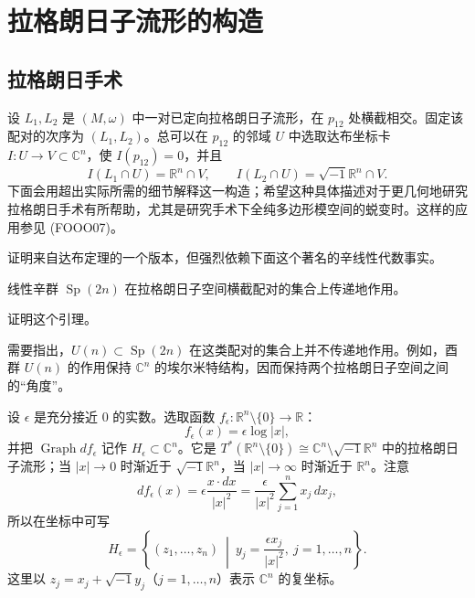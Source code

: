 \section{拉格朗日子流形的构造}
\label{sec:construction-lagrangian-submanifolds}

\subsection{拉格朗日手术}
\label{subsec:lagrangian-surgery}

设 $L_1,L_2$ 是 $(M,\omega)$ 中一对已定向拉格朗日子流形，在 $p_{12}$ 处横截相交。固定该配对的次序为 $(L_1,L_2)$。总可以在 $p_{12}$ 的邻域 $U$ 中选取达布坐标卡
$I:U\to V\subset\mathbb C^n$，使 $I(p_{12})=0$，并且
\[
 I(L_1\cap U)=\mathbb R^n\cap V,\qquad
 I(L_2\cap U)=\sqrt{-1}\mathbb R^n\cap V.
\]
下面会用超出实际所需的细节解释这一构造；希望这种具体描述对于更几何地研究拉格朗日手术有所帮助，尤其是研究手术下全纯多边形模空间的蜕变时。这样的应用参见 (FOOO07)。

证明来自达布定理的一个版本，但强烈依赖下面这个著名的辛线性代数事实。

\begin{lemma}\label{lem:sp-transitive-transverse-lagrangian-pairs}
线性辛群 $\operatorname{Sp}(2n)$ 在拉格朗日子空间横截配对的集合上传递地作用。
\end{lemma}

\begin{exercise}\label{ex:sp-transitive-transverse-lagrangian-pairs}
证明这个引理。
\end{exercise}

需要指出，$U(n)\subset\operatorname{Sp}(2n)$ 在这类配对的集合上并不传递地作用。例如，酉群 $U(n)$ 的作用保持 $\mathbb C^n$ 的埃尔米特结构，因而保持两个拉格朗日子空间之间的“角度”。

设 $\epsilon$ 是充分接近 $0$ 的实数。选取函数
$f_\epsilon:\mathbb R^n\setminus\{0\}\to\mathbb R$：
\begin{equation}
 f_\epsilon(x)=\epsilon\log|x|,
 \label{eq:surgery-log-function}
\end{equation}
并把 $\operatorname{Graph}df_\epsilon$ 记作
$H_\epsilon\subset\mathbb C^n$。它是
$T^*(\mathbb R^n\setminus\{0\})\cong
 \mathbb C^n\setminus\sqrt{-1}\mathbb R^n$ 中的拉格朗日子流形；当
$|x|\to0$ 时渐近于 $\sqrt{-1}\mathbb R^n$，当 $|x|\to\infty$ 时渐近于
$\mathbb R^n$。注意
\[
 df_\epsilon(x)=\epsilon\frac{x\cdot dx}{|x|^2}
 =\frac\epsilon{|x|^2}\sum_{j=1}^n x_j\,dx_j,
\]
所以在坐标中可写
\begin{equation}
 H_\epsilon=
 \left\{(z_1,\ldots,z_n)\ \middle|\
 y_j=\frac{\epsilon x_j}{|x|^2},\ j=1,\ldots,n\right\}.
 \label{eq:surgery-handle-model}
\end{equation}
这里以 $z_j=x_j+\sqrt{-1}y_j$（$j=1,\ldots,n$）表示 $\mathbb C^n$ 的复坐标。

